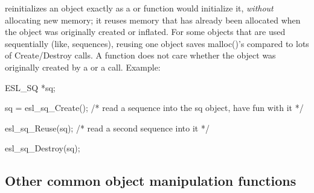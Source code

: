 \begin{sreitems}{}
\item [\ccode{Reuse}] 
    reinitializes an object exactly as a
    or  function would initialize it, \emph{without}
   allocating new memory; it reuses memory that has
   already been allocated when the object was originally created or
   inflated. For some objects that are used sequentially (like,
   sequences), reusing one object saves malloc()'s compared to
   lots of Create/Destroy calls. A  function does not
   care whether the object was originally created by a 
   or a  call. Example:

\begin{cchunk}
ESL_SQ *sq;

sq = esl_sq_Create();
  /* read a sequence into the sq object, have fun with it */

esl_sq_Reuse(sq);
  /* read a second sequence into it */

esl_sq_Destroy(sq);
\end{cchunk}

\end{sreitems}

\subsection{Other common object manipulation functions}

